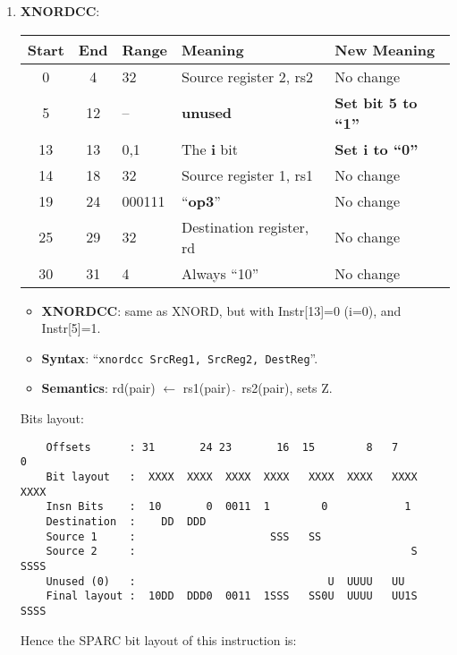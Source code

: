 \begin{enumerate}
\item \textbf{XNORDCC}:\\
  \begin{center}
    \begin{tabular}[p]{|c|c|l|l|l|}
      \hline
      \textbf{Start} & \textbf{End} & \textbf{Range} & \textbf{Meaning} &
                                                                          \textbf{New Meaning}\\
      \hline
      0 & 4 & 32 & Source register 2, rs2 & No change \\
      5 & 12 & -- & \textbf{unused} & \textbf{Set bit 5 to ``1''} \\
      13 & 13 & 0,1 & The \textbf{i} bit & \textbf{Set i to ``0''} \\
      14 & 18 & 32 & Source register 1, rs1 & No change \\
      19 & 24 & 000111 & ``\textbf{op3}'' & No change \\
      25 & 29 & 32 & Destination register, rd & No change \\
      30 & 31 & 4 & Always ``10'' & No change \\
      \hline
    \end{tabular}
  \end{center}
  \begin{itemize}
  \item []\textbf{XNORDCC}: same as XNORD, but with Instr[13]=0 (i=0), and
    Instr[5]=1.
  \item []\textbf{Syntax}: ``\texttt{xnordcc  SrcReg1, SrcReg2, DestReg}''.
  \item []\textbf{Semantics}: rd(pair) $\leftarrow$ rs1(pair) $\hat{~}$
    rs2(pair), sets Z.
  \end{itemize}
  Bits layout:
\begin{verbatim}
    Offsets      : 31       24 23       16  15        8   7        0
    Bit layout   :  XXXX  XXXX  XXXX  XXXX   XXXX  XXXX   XXXX  XXXX
    Insn Bits    :  10       0  0011  1        0            1       
    Destination  :    DD  DDD                                       
    Source 1     :                     SSS   SS
    Source 2     :                                           S  SSSS
    Unused (0)   :                              U  UUUU   UU        
    Final layout :  10DD  DDD0  0011  1SSS   SS0U  UUUU   UU1S  SSSS
\end{verbatim}

  Hence the SPARC bit layout of this instruction is:


\end{enumerate}
